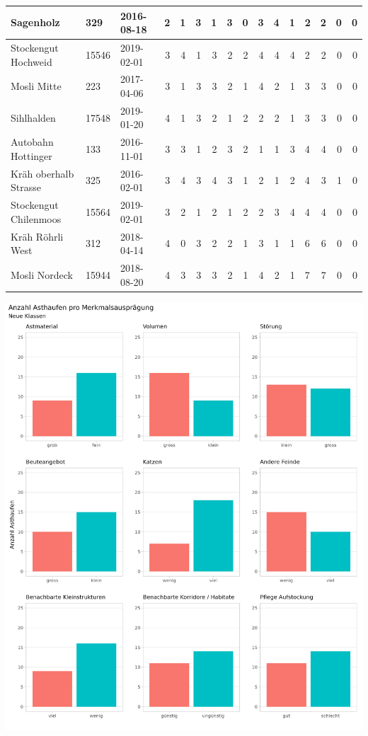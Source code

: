 \documentclass[
  oneside]{scrbook}
\begin{document}
\begin{table}
\begin{tabular}{l|l|l|r|r|r|r|r|r|r|r|r|l|r|r|r}
\hline
Sagenholz & 329 & 2016-08-18 & 2 & 1 & 3 & 1 & 3 & 0 & 3 & 4 & 1 & 2 & 2 & 0 & 0\\
\hline
Stockengut Hochweid & 15546 & 2019-02-01 & 3 & 4 & 1 & 3 & 2 & 2 & 4 & 4 & 4 & 2 & 2 & 0 & 0\\
\hline
Mosli Mitte & 223 & 2017-04-06 & 3 & 1 & 3 & 3 & 2 & 1 & 4 & 2 & 1 & 3 & 3 & 0 & 0\\
\hline
Sihlhalden & 17548 & 2019-01-20 & 4 & 1 & 3 & 2 & 1 & 2 & 2 & 2 & 1 & 3 & 3 & 0 & 0\\
\hline
Autobahn Hottinger & 133 & 2016-11-01 & 3 & 3 & 1 & 2 & 3 & 2 & 1 & 1 & 3 & 4 & 4 & 0 & 0\\
\hline
Kräh oberhalb Strasse & 325 & 2016-02-01 & 3 & 4 & 3 & 4 & 3 & 1 & 2 & 1 & 2 & 4 & 3 & 1 & 0\\
\hline
Stockengut Chilenmoos & 15564 & 2019-02-01 & 3 & 2 & 1 & 2 & 1 & 2 & 2 & 3 & 4 & 4 & 4 & 0 & 0\\
\hline
Kräh Röhrli West & 312 & 2018-04-14 & 4 & 0 & 3 & 2 & 2 & 1 & 3 & 1 & 1 & 6 & 6 & 0 & 0\\
\hline
Mosli Nordeck & 15944 & 2018-08-20 & 4 & 3 & 3 & 3 & 2 & 1 & 4 & 2 & 1 & 7 & 7 & 0 & 0\\
\hline
\end{tabular}
\end{table}

\includegraphics[width=41in]{images/asthaufen_qualitaet_histogramm_newclasses}
\end{document}
